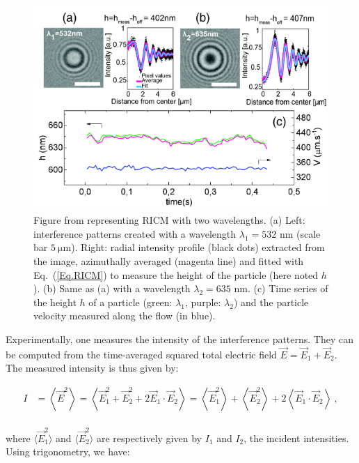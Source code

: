 \begin{figure}[H]
	\centering
	\includegraphics[scale=1]{02_body/chapter2/images/RICM.png}
	\caption{Figure from \cite{davies_elastohydrodynamic_2018} representing \gls{RICM} with two wavelengths. (a) Left: interference patterns created with a wavelength $\lambda_1 = 532$ nm (scale bar $ 5~\mathrm{\mu m}$). 
		Right: radial intensity profile (black dots) extracted from the image, azimuthally averaged (magenta line) and fitted with Eq.~(\ref{Eq.RICM}) to measure the height of the particle (here noted $h$). (b) Same as (a) with a wavelength $\lambda_2 = 635$ nm. (c) Time series of the height $h$ of a particle  (green: $ \lambda_1$, purple: $\lambda_2$) and the particle velocity measured along the flow (in blue). }
	\label{fig.RICM}
\end{figure}


Experimentally, one measures the intensity of the interference patterns. They can be computed from the time-averaged squared total electric field $\vec{E} = \vec{E}_1 + \vec{E}_2$. The measured intensity is thus given by:

\begin{equation}
	\begin{aligned}
		I & = \left\langle \vec{E}^2 \right\rangle = \left\langle \vec{E}_1^2 + \vec{E}_2^2 + 2\vec{E}_1 \cdot \vec{E}_2 \right\rangle 
		= \left\langle \vec{E}_1^2 \right\rangle + \left\langle \vec{E}_2^2 \right\rangle  + 2 \left\langle \vec{E}_1 \cdot \vec{E}_2 \right\rangle  ~,\\
	\end{aligned}
\end{equation} 

where $ \langle \vec{E}_1^2 \rangle $ and  $\langle \vec{E}_2^2 \rangle$ are respectively given by $I_1$ and $I_2$, the incident intensities. Using trigonometry, we have:

